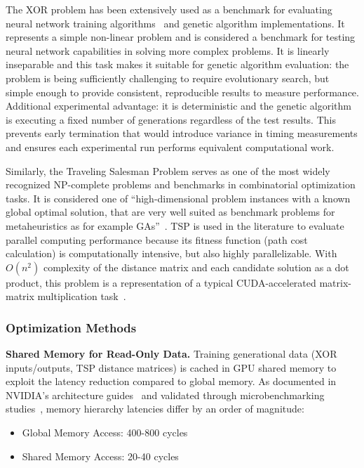 The XOR problem has been extensively used as a benchmark for evaluating neural network training algorithms~\cite{googlebooks_xor_perceptron,schaffer2001genetic, samir2017xor} and genetic algorithm implementations. It represents a simple non-linear problem and is considered a benchmark for testing neural network capabilities in solving more complex problems. It is linearly inseparable and this task makes it suitable for genetic algorithm evaluation: the problem is being sufficiently challenging to require evolutionary search, but simple enough to provide consistent, reproducible results to measure performance. Additional experimental advantage: it is deterministic and the genetic algorithm is executing a fixed number of generations regardless of the test results. This prevents early termination that would introduce variance in timing measurements and ensures each experimental run performs equivalent computational work.

Similarly, the Traveling Salesman Problem serves as one of the most widely recognized NP-complete problems and benchmarks in combinatorial optimization tasks. It is considered one of ``high-dimensional problem instances with a known global optimal solution, that are very well suited as benchmark problems for metaheuristics as for example GAs''~\cite{affenzeller2009genetic}. TSP is used in the literature to evaluate parallel computing performance because its fitness function (path cost calculation) is computationally intensive, but also highly parallelizable. With $O(n^2)$ complexity of the distance matrix and each candidate solution as a dot product, this problem is a representation of a typical CUDA-accelerated matrix-matrix multiplication task~\cite{kirk2016programming}.

\subsubsection*{Optimization Methods}

\textbf{Shared Memory for Read-Only Data.} Training generational data (XOR inputs/outputs, TSP distance matrices) is cached in GPU shared memory to exploit the latency reduction compared to global memory. As documented in NVIDIA's architecture guides~\cite{nvidia2011cuda} and validated through microbenchmarking studies~\cite{wong2010demystifying}, memory hierarchy latencies differ by an order of magnitude:

\begin{itemize}
\item Global Memory Access: 400-800 cycles
\item Shared Memory Access: 20-40 cycles
\end{itemize}

